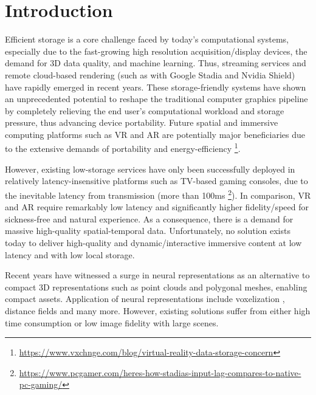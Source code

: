 \section{Introduction}

Efficient storage is a core challenge faced by today's computational systems, especially due to the fast-growing high resolution acquisition/display devices, the demand for 3D data quality, and machine learning.
Thus, streaming services and remote cloud-based rendering (such as with Google Stadia and Nvidia Shield) have rapidly emerged in recent years. These storage-friendly systems have shown an unprecedented potential to reshape the traditional computer graphics pipeline by completely relieving the end user's computational workload and storage pressure, thus advancing device portability. Future spatial and immersive computing platforms such as VR and AR are potentially major beneficiaries due to the extensive demands of portability and energy-efficiency  \footnote{\url{https://www.vxchnge.com/blog/virtual-reality-data-storage-concern}}.

However, existing low-storage services have only been successfully deployed in relatively latency-insensitive platforms such as TV-based gaming consoles, due to the inevitable latency from transmission (more than 100ms \footnote{\url{https://www.pcgamer.com/heres-how-stadias-input-lag-compares-to-native-pc-gaming/}}). 
In comparison, VR and AR require remarkably low latency and significantly higher fidelity/speed for sickness-free and natural experience. As a consequence, there is a demand for massive high-quality spatial-temporal data. Unfortunately, no solution exists today to deliver high-quality and dynamic/interactive immersive content at low latency and with low local storage.


Recent years have witnessed a surge in neural representations as an alternative to compact 3D representations such as point clouds and polygonal meshes, enabling compact assets. Application of neural representations include voxelization \cite{sitzmann2019deepvoxels}, distance fields \cite{sitzmann2019metasdf,mildenhall2020nerf,park2019deepsdf} and many more. However, existing solutions suffer from either high time consumption or low image fidelity with large scenes. 

